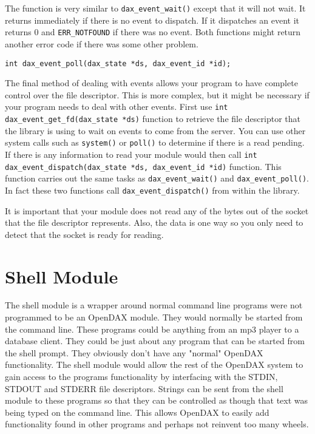 The  function is very similar to \verb|dax_event_wait()| except that it will not wait.  It returns immediately if there is no event to dispatch.  If it dispatches an event it returns 0 and \verb|ERR_NOTFOUND| if there was no event.  Both functions might return another error code if there was some other problem.

\begin{verbatim}
int dax_event_poll(dax_state *ds, dax_event_id *id);
\end{verbatim}

The final method of dealing with events allows your program to have complete control over the file descriptor.  This is more complex, but it might be necessary if your program needs to deal with other events.  First use \verb|int dax_event_get_fd(dax_state *ds)| function to retrieve the file descriptor that the library is using to wait on events to come from the server.  You can use other system calls such as \verb|system()| or \verb|poll()| to determine if there is a read pending.  If there is any information to read your module would then call \texttt{int dax\_event\_dispatch(dax\_state *ds, dax\_event\_id *id)} function.  This function carries out the same tasks as \texttt{dax\_event\_wait()} and \texttt{dax\_event\_poll()}.  In fact these two functions call \texttt{dax\_event\_dispatch()} from within the library.

It is important that your module does not read any of the bytes out of the socket that the file descriptor represents.  Also, the data is one way so you only need to detect that the socket is ready for reading.

\chapter{Shell Module}

The shell module is a wrapper around normal command line programs were not programmed to be an OpenDAX module.  They would normally be started from the command line.  These programs could be anything from an mp3 player to a database client.  They could be just about any program that can be started from the shell prompt.  They obviously don't have any "normal" OpenDAX functionality.  The shell module would allow the rest of the OpenDAX system to  gain access to the programs functionality by interfacing with the STDIN, STDOUT and STDERR file descriptors.  Strings can be sent from the shell module to these programs so that they can be controlled as though that text was being typed on the command line.  This allows OpenDAX to easily add functionality found in other programs and perhaps not reinvent too many wheels.

